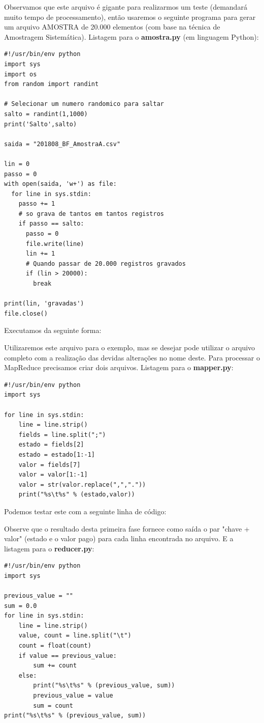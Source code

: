 \documentclass[a4paper,11pt]{article}
\begin{document}
Observamos que este arquivo é gigante para realizarmos um teste (demandará muito tempo de processamento), então usaremos o seguinte programa para gerar um arquivo AMOSTRA de 20.000 elementos (com base na técnica de Amostragem Sistemática). Listagem para o \textbf{amostra.py} (em linguagem Python):
\begin{lstlisting}
#!/usr/bin/env python
import sys
import os
from random import randint

# Selecionar um numero randomico para saltar
salto = randint(1,1000)
print('Salto',salto)

saida = "201808_BF_AmostraA.csv"

lin = 0
passo = 0
with open(saida, 'w+') as file:
  for line in sys.stdin:
    passo += 1
    # so grava de tantos em tantos registros
    if passo == salto:
      passo = 0
      file.write(line)            
      lin += 1
      # Quando passar de 20.000 registros gravados
      if (lin > 20000):
        break

print(lin, 'gravadas')
file.close()
\end{lstlisting}

Executamos da seguinte forma: \\

Utilizaremos este arquivo para o exemplo, mas se desejar pode utilizar o arquivo completo com a realização das devidas alterações no nome deste. Para processar o MapReduce precisamos criar dois arquivos. Listagem para o \textbf{mapper.py}:
\begin{lstlisting}
#!/usr/bin/env python
import sys

for line in sys.stdin:
	line = line.strip()
	fields = line.split(";")
	estado = fields[2]
	estado = estado[1:-1]
	valor = fields[7]
	valor = valor[1:-1]
	valor = str(valor.replace(",","."))
	print("%s\t%s" % (estado,valor))
\end{lstlisting}

Podemos testar este com a seguinte linha de código: \\

Observe que o resultado desta primeira fase fornece como saída o par "chave + valor" (estado e o valor pago) para cada linha encontrada no arquivo. E a listagem para o \textbf{reducer.py}:
\begin{lstlisting}
#!/usr/bin/env python
import sys

previous_value = ""
sum = 0.0
for line in sys.stdin:
	line = line.strip()
	value, count = line.split("\t")
	count = float(count)
	if value == previous_value:
		sum += count
	else:
		print("%s\t%s" % (previous_value, sum))
		previous_value = value
		sum = count
print("%s\t%s" % (previous_value, sum))
\end{lstlisting}
\end{document}
